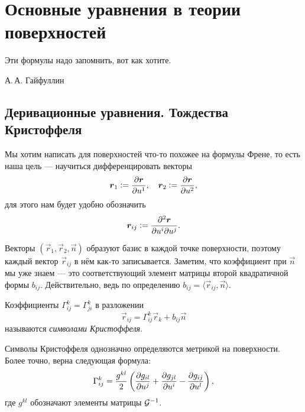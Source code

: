 \section{Основные уравнения в теории поверхностей}

\epigraph{Эти формулы надо запомнить, вот как хотите.\footnotemark}{А.\,А. Гайфуллин}


\subsection{Деривационные уравнения. Тождества Кристоффеля}

Мы хотим написать для поверхностей что-то похожее на формулы Френе, то есть наша цель --- научиться дифференцировать векторы
\[
	\vec{r}_1 \vcentcolon = \frac{\partial\vec{r}}{\partial u^1},\quad
	\vec{r}_2 \vcentcolon = \frac{\partial\vec{r}}{\partial u^2},
\]
для этого нам будет удобно обозначить
\[
	\vec{r}_{ij} \vcentcolon = \frac{\partial^2\vec{r}}{\partial u^i\partial u^j}.
\]

Векторы $(\vec{r}_1, \vec{r}_2, \vec{n})$ образуют базис в каждой точке поверхности, поэтому каждый вектор $\vec{r}_{ij}$ в нём как-то записывается. Заметим, что коэффициент при $\vec{n}$ мы уже знаем --- это соответствующий элемент матрицы второй квадратичной формы $b_{ij}$. Действительно, ведь по определению $b_{ij} = \langle\vec{r}_{ij}, \vec{n}\rangle$.

\begin{definition}
	Коэффициенты $\Gamma_{ij}^k = \Gamma_{ji}^k$ в разложении
	\begin{equation} \label{eq:DerivativeGauss}
		\vec{r}_{ij} = \Gamma_{ij}^k\vec{r}_k + b_{ij}\vec{n}
	\end{equation}
	называются \textit{символами Кристоффеля}.
\end{definition}

\begin{lemma}
	Символы Кристоффеля однозначно определяются метрикой на поверхности. Более точно, верна следующая формула:
	\begin{equation} \label{eq:ChristoffelIdentity}
		\Gamma_{ij}^k = \frac{g^{kl}}{2}\br{\frac{\partial g_{il}}{\partial u^j} + \frac{\partial g_{jl}}{\partial u^i} - \frac{\partial g_{ij}}{\partial u^l}},
	\end{equation}
	где $g^{kl}$ обозначают элементы матрицы $\G^{-1}$.
\end{lemma}

